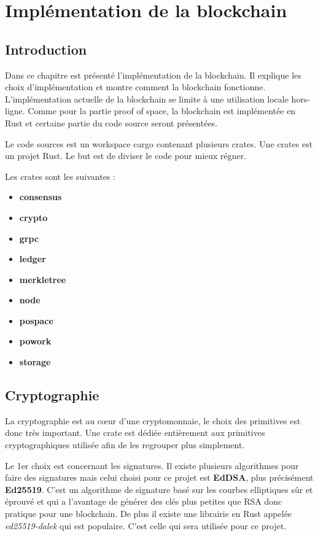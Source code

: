 \chapter{Implémentation de la blockchain}
\label{ch:realisation}

\section{Introduction}

Dans ce chapitre est présenté l'implémentation de la blockchain. Il explique les choix d'implémentation et montre comment la blockchain fonctionne. L'implémentation actuelle de la blockchain se limite à une utilisation locale hors-ligne. Comme pour la partie proof of space, la blockchain est implémentée en Rust et certaine partie du code source seront présentées.

Le code sources est un workspace cargo contenant plusieurs crates. Une crates est un projet Rust. Le but est de diviser le code pour mieux régner.

Les crates sont les suivantes :

\begin{itemize}
  \item \textbf{consensus}
  \item \textbf{crypto}
  \item \textbf{grpc}
  \item \textbf{ledger}
  \item \textbf{merkletree}
  \item \textbf{node}
  \item \textbf{pospace}
  \item \textbf{powork}
  \item \textbf{storage}
\end{itemize}

\section{Cryptographie}

La cryptographie est au cœur d'une cryptomonnaie, le choix des primitives est donc très important. Une crate est dédiée entièrement aux primitives cryptographiques utilisée afin de les regrouper plus simplement.

Le 1er choix est concernant les signatures. Il existe plusieurs algorithmes pour faire des signatures mais celui choisi pour ce projet est \textbf{EdDSA}, plus précisément \textbf{Ed25519}. C'est un algorithme de signature basé sur les courbes elliptiques sûr et éprouvé et qui a l'avantage de générer des clés plus petites que RSA donc pratique pour une blockchain. De plus il existe une librairie en Rust appelée \emph{ed25519-dalek} qui est populaire. C'est celle qui sera utilisée pour ce projet.


